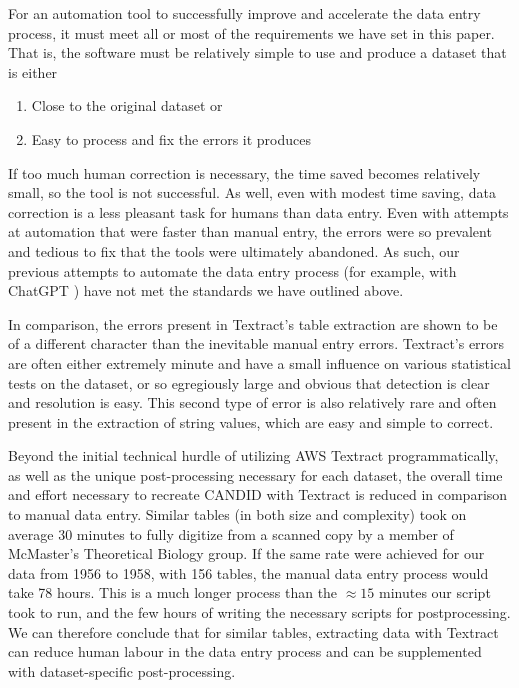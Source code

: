 \documentclass[12pt]{article}
\begin{document}
For an automation tool to successfully improve and accelerate the data entry process, it must meet all or most of the requirements we have set in this paper. That is, the software must be relatively simple to use and produce a dataset that is either 
\begin{enumerate}
    \item Close to the original dataset or
    \item Easy to process and fix the errors it produces
\end{enumerate}
If too much human correction is necessary, the time saved becomes relatively small, so the tool is not successful. As well, even with modest time saving, data correction is a less pleasant task for humans than data entry. Even with attempts at automation that were faster than manual entry, the errors were so prevalent and tedious to fix that the tools were ultimately abandoned. As such, our previous attempts to automate the data entry process (for example, with ChatGPT \cite{stewart}) have not met the standards we have outlined above. 

In comparison, the errors present in Textract's table extraction are shown to be of a different character than the inevitable manual entry errors. Textract's errors are often either extremely minute and have a small influence on various statistical tests on the dataset, or so egregiously large and obvious that detection is clear and resolution is easy. This second type of error is also relatively rare and often present in the extraction of string values, which are easy and simple to correct. 

Beyond the initial technical hurdle of utilizing AWS Textract programmatically, as well as the unique post-processing necessary for each dataset, the overall time and effort necessary to recreate CANDID with Textract is reduced in comparison to manual data entry. Similar tables (in both size and complexity) took on average 30 minutes to fully digitize from a scanned copy by a member of McMaster's Theoretical Biology group. If the same rate were achieved for our data from 1956 to 1958, with 156 tables, the manual data entry process would take 78 hours. This is a much longer process than the $\approx15$ minutes our script took to run, and the few hours of writing the necessary scripts for postprocessing. We can therefore conclude that for similar tables, extracting data with Textract can reduce human labour in the data entry process and can be supplemented with dataset-specific post-processing.
\end{document}
